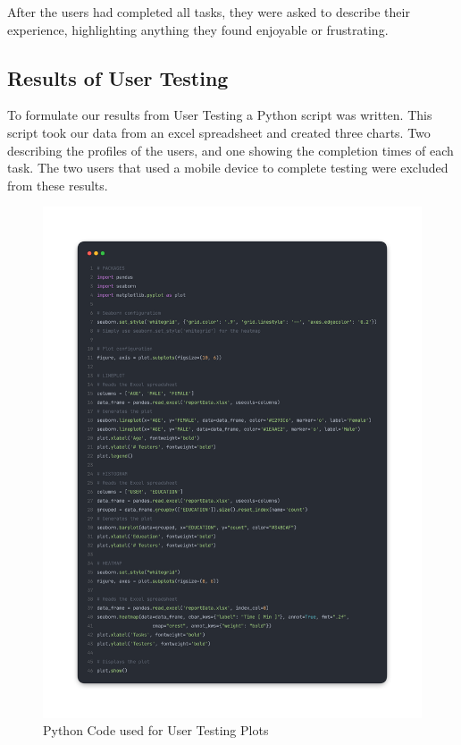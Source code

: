 After the users had completed all tasks, they were asked to describe their experience, highlighting anything they found enjoyable or frustrating. 

\subsection{Results of User Testing}

To formulate our results from User Testing a Python script was written. This script took our data from an excel spreadsheet and created three charts. Two describing the profiles of the users, and one showing the completion times of each task. 
The two users that used a mobile device to complete testing were excluded from these results. 

\begin{figure}[h]
    \centering
    \includegraphics[scale=0.12]{Resources/Shared/pythonCode.png}
    \caption{Python Code used for User Testing Plots}
\end{figure}

